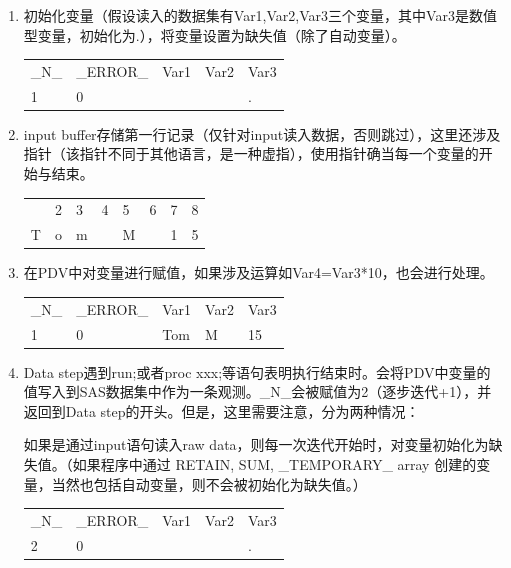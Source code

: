 \documentclass[
  letterpaper,
  DIV=11,
  numbers=noendperiod]{scrreprt}
\begin{document}
\begin{enumerate}
\def\labelenumi{\arabic{enumi}.}
\item
  初始化变量（假设读入的数据集有Var1,Var2,Var3三个变量，其中Var3是数值型变量，初始化为.），将变量设置为缺失值（除了自动变量）。

  \begin{longtable}[]{@{}lllll@{}}
  \toprule\noalign{}
  \endhead
  \bottomrule\noalign{}
  \endlastfoot
  \_N\_ & \_ERROR\_ & Var1 & Var2 & Var3 \\
  1 & 0 & & & . \\
  \end{longtable}
\item
  input
  buffer存储第一行记录（仅针对input读入数据，否则跳过），这里还涉及指针（该指针不同于其他语言，是一种虚指），使用指针确当每一个变量的开始与结束。

  \begin{longtable}[]{@{}llllllll@{}}
  \toprule\noalign{}
  \endhead
  \bottomrule\noalign{}
  \endlastfoot
  1 & 2 & 3 & 4 & 5 & 6 & 7 & 8 \\
  T & o & m & & M & & 1 & 5 \\
  \end{longtable}
\item
  在PDV中对变量进行赋值，如果涉及运算如Var4=Var3*10，也会进行处理。

  \begin{longtable}[]{@{}lllll@{}}
  \toprule\noalign{}
  \endhead
  \bottomrule\noalign{}
  \endlastfoot
  \_N\_ & \_ERROR\_ & Var1 & Var2 & Var3 \\
  1 & 0 & Tom & M & 15 \\
  \end{longtable}
\item
  Data step遇到run;或者proc
  xxx;等语句表明执行结束时。会将PDV中变量的值写入到SAS数据集中作为一条观测。\_N\_会被赋值为2（逐步迭代+1），并返回到Data
  step的开头。但是，这里需要注意，分为两种情况：

  如果是通过input语句读入raw
  data，则每一次迭代开始时，对变量初始化为缺失值。（如果程序中通过
  RETAIN, SUM, \_TEMPORARY\_ array
  创建的变量，当然也包括自动变量，则不会被初始化为缺失值。）

  \begin{longtable}[]{@{}lllll@{}}
  \toprule\noalign{}
  \endhead
  \bottomrule\noalign{}
  \endlastfoot
  \_N\_ & \_ERROR\_ & Var1 & Var2 & Var3 \\
  2 & 0 & & & . \\
  \end{longtable}


\end{enumerate}
\end{document}
